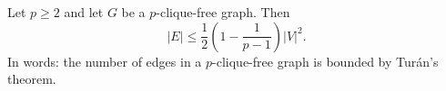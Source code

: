 \begin{theorem}
  \label{thm:turans}
  \leanok
Let \(p \geq 2\) and let \(G\) be a \(p\)-clique-free graph. Then
\[
|E| \leq \frac{1}{2}\left(1 - \frac{1}{p-1}\right) |V|^2.
\]
In words: the number of edges in a \(p\)-clique-free graph is bounded by Turán's theorem.
\end{theorem}